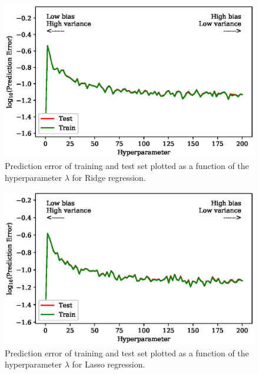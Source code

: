\documentclass[a4paper, 10pt]{article}
\begin{document}
\begin{figure}[H]
    \includegraphics{figs/biasvariancetradeoff_Ridge.eps}
    \caption{Prediction error of training and test set plotted as a function of the hyperparameter $\lambda$ for Ridge regression.}
\end{figure}    

\begin{figure}[H]
    \includegraphics{figs/biasvariancetradeoff_LASSO.eps}
    \caption{Prediction error of training and test set plotted as a function of the hyperparameter $\lambda$ for Lasso regression.}
\end{figure} 
\end{document}
